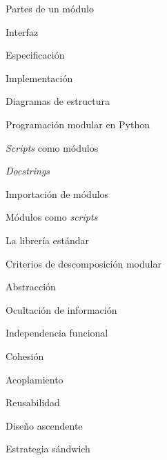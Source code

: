 \begin{longenum}
\begin{longenum}
\begin{longenum}
            \item Partes de un módulo
            \begin{longenum}
                \item Interfaz
                \begin{longenum}
                    \item Especificación
                \end{longenum}
                \item Implementación
            \end{longenum}
            \item Diagramas de estructura
        \end{longenum}
        \item Programación modular en Python
        \begin{longenum}
            \item \textit{Scripts} como módulos
            \begin{longenum}
                \item \textit{Docstrings}
            \end{longenum}
            \item Importación de módulos
            \item Módulos como \textit{scripts}
            \item La librería estándar
        \end{longenum}
        \item Criterios de descomposición modular
        \begin{longenum}
            \item Abstracción
            \item Ocultación de información
            \item Independencia funcional
            \begin{longenum}
                \item Cohesión
                \item Acoplamiento
            \end{longenum}
            \item Reusabilidad
            \begin{longenum}
                \item Diseño ascendente
                \item Estrategia sándwich
            \end{longenum}
        \end{longenum}

\end{longenum}
\end{longenum}
